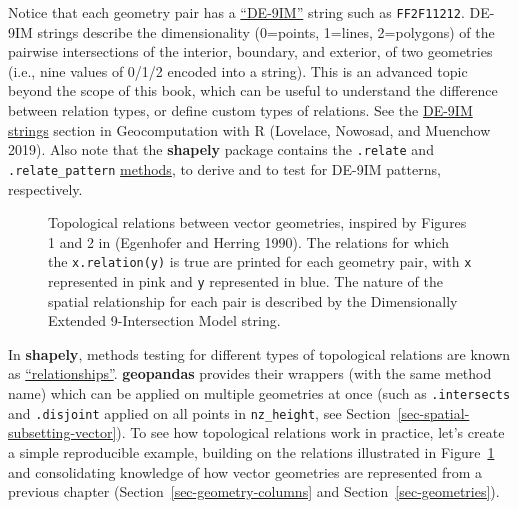 \documentclass[
  letterpaper,
]{krantz}
\begin{document}
\begin{tcolorbox}[enhanced jigsaw, title=\textcolor{quarto-callout-note-color}{\faInfo}\hspace{0.5em}{Note}, coltitle=black, colbacktitle=quarto-callout-note-color!10!white, breakable, titlerule=0mm, colframe=quarto-callout-note-color-frame, opacitybacktitle=0.6, colback=white, bottomrule=.15mm, left=2mm, leftrule=.75mm, toprule=.15mm, toptitle=1mm, bottomtitle=1mm, arc=.35mm, opacityback=0, rightrule=.15mm]

Notice that each geometry pair has a
\href{https://en.wikipedia.org/wiki/DE-9IM}{``DE-9IM''} string such as
\texttt{FF2F11212}. DE-9IM strings describe the dimensionality
(0=points, 1=lines, 2=polygons) of the pairwise intersections of the
interior, boundary, and exterior, of two geometries (i.e., nine values
of 0/1/2 encoded into a string). This is an advanced topic beyond the
scope of this book, which can be useful to understand the difference
between relation types, or define custom types of relations. See the
\href{https://r.geocompx.org/spatial-operations\#de-9im-strings}{DE-9IM
strings} section in Geocomputation with R (Lovelace, Nowosad, and
Muenchow 2019). Also note that the \textbf{shapely} package contains the
\texttt{.relate} and \texttt{.relate\_pattern}
\href{https://shapely.readthedocs.io/en/stable/manual.html\#de-9im-relationships}{methods},
to derive and to test for DE-9IM patterns, respectively.

\end{tcolorbox}

\begin{figure}


\caption{\label{fig-spatial-relations}Topological relations between
vector geometries, inspired by Figures 1 and 2 in (Egenhofer and Herring
1990). The relations for which the \texttt{x.relation(y)} is true are
printed for each geometry pair, with \texttt{x} represented in pink and
\texttt{y} represented in blue. The nature of the spatial relationship
for each pair is described by the Dimensionally Extended 9-Intersection
Model string.}

\end{figure}%

In \textbf{shapely}, methods testing for different types of topological
relations are known as
\href{https://shapely.readthedocs.io/en/stable/manual.html\#relationships}{``relationships''}.
\textbf{geopandas} provides their wrappers (with the same method name)
which can be applied on multiple geometries at once (such as
\texttt{.intersects} and \texttt{.disjoint} applied on all points in
\texttt{nz\_height}, see Section~\ref{sec-spatial-subsetting-vector}).
To see how topological relations work in practice, let's create a simple
reproducible example, building on the relations illustrated in
Figure~\ref{fig-spatial-relations} and consolidating knowledge of how
vector geometries are represented from a previous chapter
(Section~\ref{sec-geometry-columns} and Section~\ref{sec-geometries}).
\end{document}
